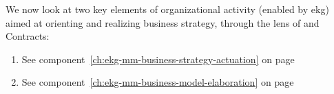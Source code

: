 We now look at two key elements of organizational activity (enabled by \gls{ekg}) aimed at orienting and
realizing business strategy, through the lens of 
and Contracts:

\begin{enumerate}
    \item 

    See component~\ref{ch:ekg-mm-business-strategy-actuation} 
    on page \pageref{ch:ekg-mm-business-strategy-actuation}

    \item 

    See component~\ref{ch:ekg-mm-business-model-elaboration} 
    on page \pageref{ch:ekg-mm-business-model-elaboration}
\end{enumerate}
